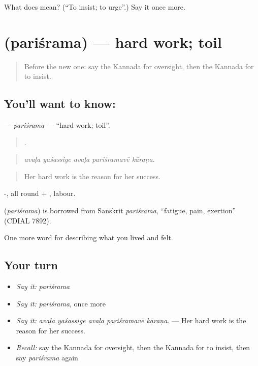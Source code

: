 \begin{tcolorbox}[breakable,colback=teal!4,colframe=teal!35!black,title={Before you move on}]
What does  mean? (\textquotedblleft{}To insist; to urge\textquotedblright{}.) Say it once more.
\end{tcolorbox}
\section[\texorpdfstring{\kn{ಪರಿಶ್ರಮ} (pariśrama)}{ಪರಿಶ್ರಮ (pariśrama)}]{ (pariśrama) — hard work; toil}

\label{lesson:KA-C521-parisrama}



\begin{quote}
Before the new one: say the Kannada for oversight, then the Kannada for to insist.
\end{quote}

\subsection*{You'll want to know: }
\textbf{} — \emph{pariśrama} — \textquotedblleft{}hard work; toil\textquotedblright{}.

\begin{quote}
    .
\end{quote}

\begin{quote}
\emph{avaḷa yaśassige avaḷa pariśramavē kāraṇa.}
\end{quote}

\begin{quote}
Her hard work is the reason for her success.
\end{quote}

-, all round + , labour.

\begin{cousinweb}
\textbf{} (\emph{pariśrama}) is borrowed from Sanskrit \emph{pariśrama}, \textquotedblleft{}fatigue, pain, exertion\textquotedblright{} (CDIAL 7892).
\end{cousinweb}

\begin{grammarlens}[title={What you've built}]
One more word for describing what you lived and felt.
\end{grammarlens}

\subsection*{Your turn}
\begin{itemize}
\raggedright
  \item \emph{Say it:} \emph{pariśrama}
  \item \emph{Say it:} \emph{pariśrama}, once more
  \item \emph{Say it:} \emph{avaḷa yaśassige avaḷa pariśramavē kāraṇa.} — Her hard work is the reason for her success.
  \item \emph{Recall:} say the Kannada for oversight, then the Kannada for to insist, then say \emph{pariśrama} again
\end{itemize}

